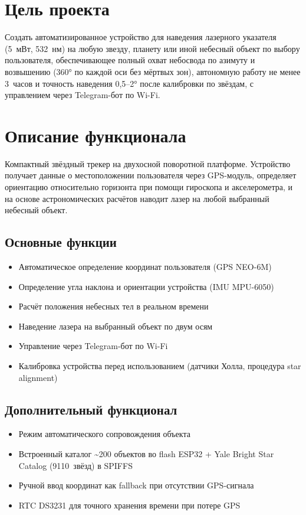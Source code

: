 \documentclass[12pt, a4paper]{article}
\begin{document}
\section*{Цель проекта}

Создать автоматизированное устройство для наведения лазерного указателя (5~мВт, 532~нм) на любую звезду, планету или иной небесный объект по выбору пользователя, обеспечивающее полный охват небосвода по азимуту и возвышению (360° по каждой оси без мёртвых зон), автономную работу не менее 3~часов и точность наведения 0{,}5--2° после калибровки по звёздам, с управлением через Telegram-бот по Wi-Fi.

\section*{Описание функционала}

Компактный звёздный трекер на двухосной поворотной платформе. Устройство получает данные о местоположении пользователя через GPS-модуль, определяет ориентацию относительно горизонта при помощи гироскопа и акселерометра, и на основе астрономических расчётов наводит лазер на любой выбранный небесный объект.

\subsection*{Основные функции}

\begin{itemize}[leftmargin=*, nosep]
    \item Автоматическое определение координат пользователя (GPS NEO-6M)
    \item Определение угла наклона и ориентации устройства (IMU MPU-6050)
    \item Расчёт положения небесных тел в реальном времени
    \item Наведение лазера на выбранный объект по двум осям
    \item Управление через Telegram-бот по Wi-Fi
    \item Калибровка устройства перед использованием (датчики Холла, процедура star alignment)
\end{itemize}

\subsection*{Дополнительный функционал}

\begin{itemize}[leftmargin=*, nosep]
    \item Режим автоматического сопровождения объекта
    \item Встроенный каталог {\textasciitilde}200 объектов во flash ESP32 + Yale Bright Star Catalog (9110~звёзд) в SPIFFS
    \item Ручной ввод координат как fallback при отсутствии GPS-сигнала
    \item RTC DS3231 для точного хранения времени при потере GPS
\end{itemize}
\end{document}
